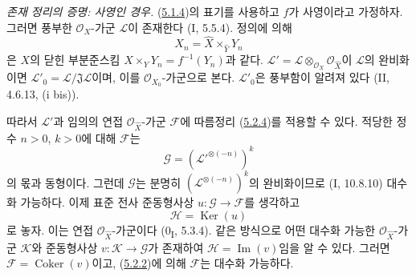 \begin{env}[5.2.5]
\label{III.5.2.5-fr}
\emph{존재 정리의 증명: 사영인 경우.}
(\hyperref[III.5.1.4-fr]{5.1.4})의 표기를 사용하고 $f$가
사영이라고 가정하자. 그러면 풍부한 $\mathcal O_X$-가군
$\mathcal L$이 존재한다 (I, 5.5.4). 정의에 의해
\[
X_n=\widehat X\times_{\widehat Y}Y_n
\]
은 $X$의 닫힌 부분준스킴
$X\times_Y Y_n=f^{-1}(Y_n)$과 같다.
$\mathcal L'=\mathcal L\otimes_{\mathcal O_X}
\mathcal O_{\widehat X}$이 $\mathcal L$의 완비화이면
$\mathcal L'_0=\mathcal L/\mathfrak J\mathcal L$이며, 이를
$\mathcal O_{X_0}$-가군으로 본다. $\mathcal L'_0$은 풍부함이
알려져 있다 (II, 4.6.13, (i bis)).

따라서 $\mathcal L'$과 임의의 연접
$\mathcal O_{\widehat X}$-가군 $\mathcal F$에 따름정리
(\hyperref[III.5.2.4-fr]{5.2.4})를 적용할 수 있다. 적당한 정수
$n>0$, $k>0$에 대해 $\mathcal F$는
\[
\mathcal G=(\mathcal L'^{\otimes(-n)})^k
\]
의 몫과 동형이다. 그런데 $\mathcal G$는 분명히
$(\mathcal L^{\otimes(-n)})^k$의 완비화이므로 (I, 10.8.10)
대수화 가능하다. 이제 표준 전사 준동형사상
$u:\mathcal G\to\mathcal F$를 생각하고
\[
\mathcal H=\operatorname{Ker}(u)
\]
로 놓자. 이는 연접 $\mathcal O_{\widehat X}$-가군이다
(0\textsubscript{I}, 5.3.4). 같은 방식으로 어떤 대수화 가능한
$\mathcal O_{\widehat X}$-가군 $\mathcal K$와 준동형사상
$v:\mathcal K\to\mathcal G$가 존재하여
$\mathcal H=\operatorname{Im}(v)$임을 알 수 있다. 그러면
$\mathcal F=\operatorname{Coker}(v)$이고,
(\hyperref[III.5.2.2-fr]{5.2.2})에 의해 $\mathcal F$는 대수화
가능하다.
\end{env}

